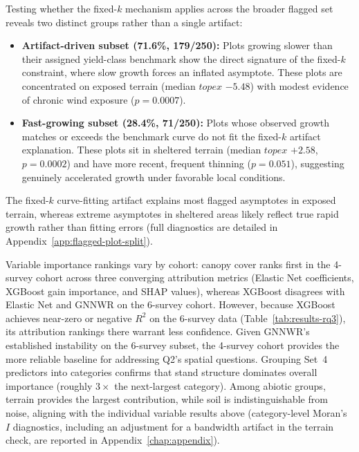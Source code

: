 \documentclass[logo,msc,ai]{infthesis}           %
\begin{document}
Testing whether the fixed-$k$ mechanism applies across the broader flagged set reveals two distinct groups rather than a single artifact:
\begin{itemize}
    \item \textbf{Artifact-driven subset (71.6\%, 179/250):} Plots growing slower than their assigned yield-class benchmark show the direct signature of the fixed-$k$ constraint, where slow growth forces an inflated asymptote. These plots are concentrated on exposed terrain (median $\mathit{topex}$ $-5.48$) with modest evidence of chronic wind exposure ($p = 0.0007$).
    \item \textbf{Fast-growing subset (28.4\%, 71/250):} Plots whose observed growth matches or exceeds the benchmark curve do not fit the fixed-$k$ artifact explanation. These plots sit in sheltered terrain (median $\mathit{topex}$ $+2.58$, $p = 0.0002$) and have more recent, frequent thinning ($p = 0.051$), suggesting genuinely accelerated growth under favorable local conditions.
\end{itemize}
The fixed-$k$ curve-fitting artifact explains most flagged asymptotes in exposed terrain, whereas extreme asymptotes in sheltered areas likely reflect true rapid growth rather than fitting errors (full diagnostics are detailed in Appendix~\ref{app:flagged-plot-split}).

Variable importance rankings vary by cohort: canopy cover ranks first in the 4-survey cohort across three converging attribution metrics (Elastic Net coefficients, XGBoost gain importance, and SHAP values), whereas XGBoost disagrees with Elastic Net and GNNWR on the 6-survey cohort. However, because XGBoost achieves near-zero or negative $R^2$ on the 6-survey data (Table~\ref{tab:results-rq3}), its attribution rankings there warrant less confidence. Given GNNWR's established instability on the 6-survey subset, the 4-survey cohort provides the more reliable baseline for addressing Q2's spatial questions. Grouping Set~4 predictors into categories confirms that stand structure dominates overall importance (roughly $3\times$ the next-largest category). Among abiotic groups, terrain provides the largest contribution, while soil is indistinguishable from noise, aligning with the individual variable results above (category-level Moran's $I$ diagnostics, including an adjustment for a bandwidth artifact in the terrain check, are reported in Appendix~\ref{chap:appendix}).
\end{document}

